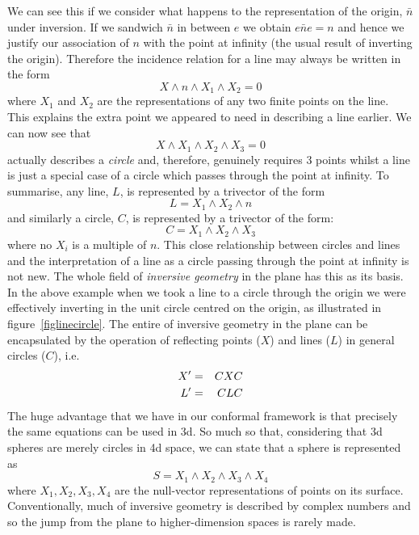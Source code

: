 We can see this if we consider what happens to the representation of the
origin, $\bar{n}$ under inversion. If we sandwich $\bar{n}$ in between $e$
we obtain $e\bar{n}e = n$ and hence we justify our association of $n$
with the point at infinity (the usual result of inverting the origin).
Therefore the incidence relation for a line may always be written in the
form
%
\begin{equation}
    X \wedge n \wedge X_1 \wedge X_2 = 0
    \end{equation}
%
where $X_1$ and $X_2$ are the representations of any two finite points 
on the line. This explains the extra point we appeared to need in
describing a line earlier. We can now see that
%
\[     X \wedge X_1 \wedge X_2 \wedge X_3 = 0 \]
%
actually describes a \emph{circle} and, therefore, genuinely requires 3 points
whilst a line is just a special case of a circle which passes through the point
at infinity.  To summarise, any line, $L$, is represented by a trivector of the
form
%
\begin{equation}
    L =  X_1 \wedge X_2 \wedge n
    \end{equation}
%
and similarly a circle, $C$, is represented by a trivector
of the form:
%
\begin{equation}
    C =  X_1 \wedge X_2 \wedge X_3
    \end{equation}
%
where no $X_i$ is a multiple of $n$. This close
relationship between circles and lines and the
interpretation of a line as a circle passing through the
point at infinity is not new. The whole field of
\emph{inversive geometry} \cite{brannan} in the plane has
this as its basis. In the above example when we took a
line to a circle through the origin we were effectively
inverting in the unit circle centred on the origin, as
illustrated in figure~\ref{figlinecircle}. The entire of
inversive geometry in the plane can be encapsulated by
the operation of reflecting points ($X$) and lines ($L$)
in general circles ($C$), i.e.
%
\begin{eqnarray}
   X' & = & CXC  \nonumber \\
   L' & = & CLC \nonumber
   \end{eqnarray}
%
The huge advantage that we have in our conformal
framework is that precisely the same equations can be
used in 3d. So much so that, considering that 3d spheres
are merely circles in 4d space, we can state that a sphere
is represented as 
%
\begin{equation}
    S =  X_1 \wedge X_2 \wedge X_3 \wedge X_4
    \end{equation}
%
where $X_1, X_2, X_3, X_4$ are the null-vector representations
of points on its surface.
Conventionally, much of inversive geometry
is described by complex numbers and so the jump from the
plane to higher-dimension spaces is rarely made.


